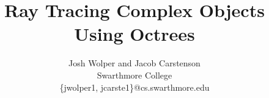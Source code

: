 \documentclass{sig-alternate}
\begin{document}
\date{}

\title{Ray Tracing Complex Objects Using Octrees}

\author{
    Josh Wolper and Jacob Carstenson\\
    Swarthmore College\\
    \{jwolper1, jcarste1\}@cs.swarthmore.edu
}

\maketitle










\balance
\end{document}
